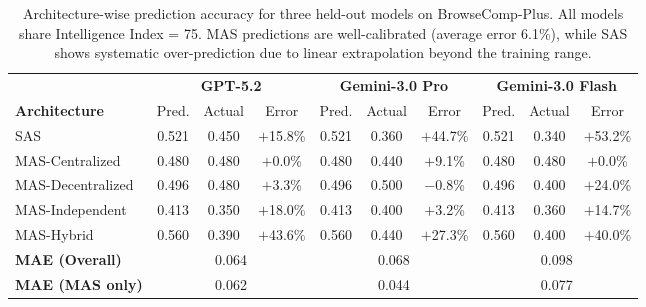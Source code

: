 \begin{table}[t]
\caption{Architecture-wise prediction accuracy for three held-out models on BrowseComp-Plus. All models share Intelligence Index = 75. MAS predictions are well-calibrated (average error 6.1\%), while SAS shows systematic over-prediction due to linear extrapolation beyond the training range.}
\label{tab:architecture_predictions}
\footnotesize
\centering
\begin{tabular}{l ccc ccc ccc}
\toprule
& \multicolumn{3}{c}{\textbf{GPT-5.2}} & \multicolumn{3}{c}{\textbf{Gemini-3.0 Pro}} & \multicolumn{3}{c}{\textbf{Gemini-3.0 Flash}} \\
\cmidrule(lr){2-4} \cmidrule(lr){5-7} \cmidrule(lr){8-10}
\textbf{Architecture} & Pred. & Actual & Error & Pred. & Actual & Error & Pred. & Actual & Error \\
\midrule
SAS & 0.521 & 0.450 & $+$15.8\% & 0.521 & 0.360 & $+$44.7\% & 0.521 & 0.340 & $+$53.2\% \\
MAS-Centralized & 0.480 & 0.480 & $+$0.0\% & 0.480 & 0.440 & $+$9.1\% & 0.480 & 0.480 & $+$0.0\% \\
MAS-Decentralized & 0.496 & 0.480 & $+$3.3\% & 0.496 & 0.500 & $-$0.8\% & 0.496 & 0.400 & $+$24.0\% \\
MAS-Independent & 0.413 & 0.350 & $+$18.0\% & 0.413 & 0.400 & $+$3.2\% & 0.413 & 0.360 & $+$14.7\% \\
MAS-Hybrid & 0.560 & 0.390 & $+$43.6\% & 0.560 & 0.440 & $+$27.3\% & 0.560 & 0.400 & $+$40.0\% \\
\midrule
\textbf{MAE (Overall)} & \multicolumn{3}{c}{0.064} & \multicolumn{3}{c}{0.068} & \multicolumn{3}{c}{0.098} \\
\textbf{MAE (MAS only)} & \multicolumn{3}{c}{0.062} & \multicolumn{3}{c}{0.044} & \multicolumn{3}{c}{0.077} \\
\bottomrule
\end{tabular}
\end{table}


